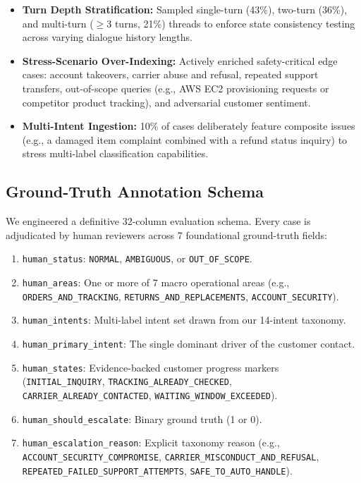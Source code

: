 \documentclass[10pt,twocolumn,a4paper]{article}
\begin{document}
\begin{itemize}
  \item \textbf{Turn Depth Stratification:} Sampled single-turn (43\%),
        two-turn (36\%), and multi-turn ($\ge$3 turns, 21\%) threads to
        enforce state consistency testing across varying dialogue
        history lengths.

  \item \textbf{Stress-Scenario Over-Indexing:} Actively enriched
        safety-critical edge cases: account takeovers, carrier abuse
        and refusal, repeated support transfers, out-of-scope queries
        (e.g., AWS EC2 provisioning requests or competitor product
        tracking), and adversarial customer sentiment.

  \item \textbf{Multi-Intent Ingestion:} 10\% of cases deliberately
        feature composite issues (e.g., a damaged item complaint
        combined with a refund status inquiry) to stress multi-label
        classification capabilities.
\end{itemize}

\subsection{Ground-Truth Annotation Schema}
We engineered a definitive 32-column evaluation schema. Every case is
adjudicated by human reviewers across 7 foundational ground-truth
fields:

\begin{enumerate}
  \item \texttt{human\_status}: \texttt{NORMAL}, \texttt{AMBIGUOUS},
        or \texttt{OUT\_OF\_SCOPE}.
  \item \texttt{human\_areas}: One or more of 7 macro operational areas
        (e.g., \texttt{ORDERS\_AND\_TRACKING},
        \texttt{RETURNS\_AND\_REPLACEMENTS},
        \texttt{ACCOUNT\_SECURITY}).
  \item \texttt{human\_intents}: Multi-label intent set drawn from our
        14-intent taxonomy.
  \item \texttt{human\_primary\_intent}: The single dominant driver
        of the customer contact.
  \item \texttt{human\_states}: Evidence-backed customer progress markers
        (\texttt{INITIAL\_INQUIRY}, \texttt{TRACKING\_ALREADY\_CHECKED},
        \texttt{CARRIER\_ALREADY\_CONTACTED},
        \texttt{WAITING\_WINDOW\_EXCEEDED}).
  \item \texttt{human\_should\_escalate}: Binary ground truth (1 or 0).
  \item \texttt{human\_escalation\_reason}: Explicit taxonomy reason
        (e.g., \texttt{ACCOUNT\_SECURITY\_COMPROMISE},
        \texttt{CARRIER\_MISCONDUCT\_AND\_REFUSAL},
        \texttt{REPEATED\_FAILED\_SUPPORT\_ATTEMPTS},
        \texttt{SAFE\_TO\_AUTO\_HANDLE}).
\end{enumerate}
\end{document}
